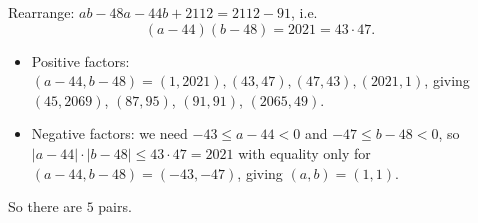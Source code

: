 Rearrange: $ab-48a-44b+2112=2112-91$, i.e.
\[(a-44)(b-48)=2021=43\cdot47.\]
\begin{itemize}
\item Positive factors: $(a-44,b-48)=(1,2021),(43,47),(47,43),(2021,1)$, giving $(45,2069)$, $(87,95)$, $(91,91)$, $(2065,49)$.
\item Negative factors: we need $-43\le a-44<0$ and $-47\le b-48<0$, so $|a-44|\cdot|b-48|\le43\cdot47=2021$ with equality only for $(a-44,b-48)=(-43,-47)$, giving $(a,b)=(1,1)$.
\end{itemize}
So there are $\boxed{5}$ pairs.
